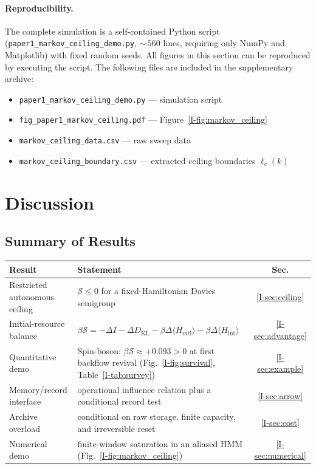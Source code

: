 \documentclass[12pt,a4paper,openany]{book}
\begin{document}
\paragraph{Reproducibility.}
\begin{sloppypar}
The complete simulation is a self-contained Python script
(\texttt{paper1\_markov\_ceiling\_demo.py}, ${\sim}\,560$
lines, requiring only NumPy and Matplotlib) with fixed
random seeds.  All figures in this section can be
reproduced by executing the script.  The following files
are included in the supplementary archive:
\begin{itemize}
\item \texttt{paper1\_markov\_ceiling\_demo.py} --- simulation script
\item \texttt{fig\_paper1\_markov\_ceiling.pdf} --- Figure~\ref{I-fig:markov_ceiling}
\item \texttt{markov\_ceiling\_data.csv} --- raw sweep data
\item \texttt{markov\_ceiling\_boundary.csv} --- extracted
  ceiling boundaries $\ell_c(k)$
\end{itemize}
\end{sloppypar}

\section{Discussion}
\label{I-sec:discussion}

\subsection{Summary of Results}

\begin{center}
\small
\setlength{\tabcolsep}{4pt}%
\begin{tabular}{@{}lP{7.5cm}c@{}}
\toprule
\textbf{Result} & \textbf{Statement} & \textbf{Sec.} \\
\midrule
Restricted autonomous ceiling &
  $\mathcal{S} \leq 0$ for a fixed-Hamiltonian Davies semigroup
  & \ref{I-sec:ceiling} \\[3pt]
Initial-resource balance &
  $\beta\mathcal{S} = -\Delta I
  - \Delta D_{\mathrm{KL}}
  - \beta\Delta\langle H_{\mathrm{ctrl}}\rangle
  - \beta\Delta\langle H_{\mathrm{int}}\rangle$
  & \ref{I-sec:advantage} \\[3pt]
Quantitative demo &
  Spin-boson: $\beta\mathcal{S} \approx +0.093 > 0$
  at first backflow revival (Fig.~\ref{I-fig:survival},
  Table~\ref{I-tab:survey})
  & \ref{I-sec:example} \\[3pt]
Memory/record interface &
  operational influence relation plus a conditional record test
  & \ref{I-sec:arrow} \\[3pt]
Archive overload &
  conditional on raw storage, finite capacity, and irreversible reset
  & \ref{I-sec:cost} \\[3pt]
Numerical demo &
  finite-window saturation in an aliased HMM
  (Fig.~\ref{I-fig:markov_ceiling})
  & \ref{I-sec:numerical} \\
\bottomrule
\end{tabular}
\end{center}
\end{document}
